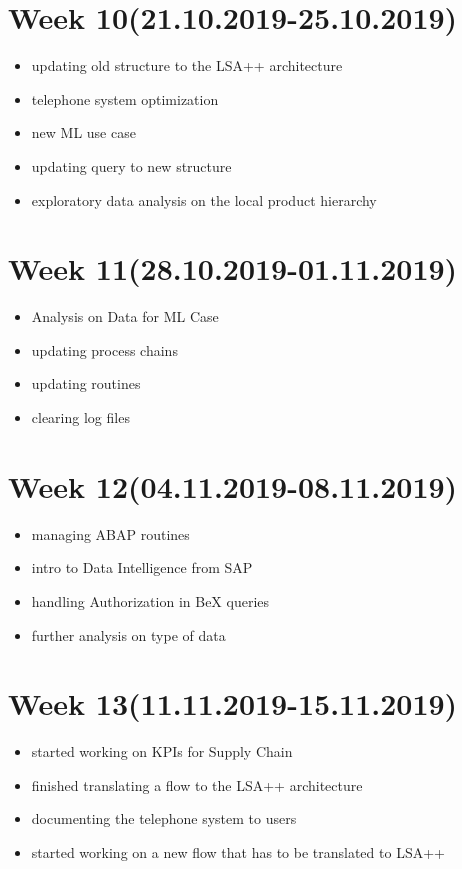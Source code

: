 \documentclass{article}
\begin{document}
	\section{Week 10(21.10.2019-25.10.2019)}
	\begin{itemize}
		\item updating old structure to the LSA++ architecture
		\item telephone system optimization
		\item new ML use case
		\item updating query to new structure
		\item exploratory data analysis on the local product hierarchy
	\end{itemize}

	\section{Week 11(28.10.2019-01.11.2019)}
	\begin{itemize}
		\item Analysis on Data for ML Case
		\item updating process chains
		\item updating routines
		\item clearing log files
	\end{itemize}

	\section{Week 12(04.11.2019-08.11.2019)}
	\begin{itemize}
		\item managing ABAP routines
		\item intro to Data Intelligence from SAP
		\item handling Authorization in BeX queries
		\item further analysis on type of data
	\end{itemize}

	\section{Week 13(11.11.2019-15.11.2019)}
	\begin{itemize}
		\item started working on KPIs for Supply Chain
		\item finished translating a flow to the LSA++ architecture
		\item documenting the telephone system to users
		\item started working on a new flow that has to be translated to LSA++
	\end{itemize}
\end{document}
